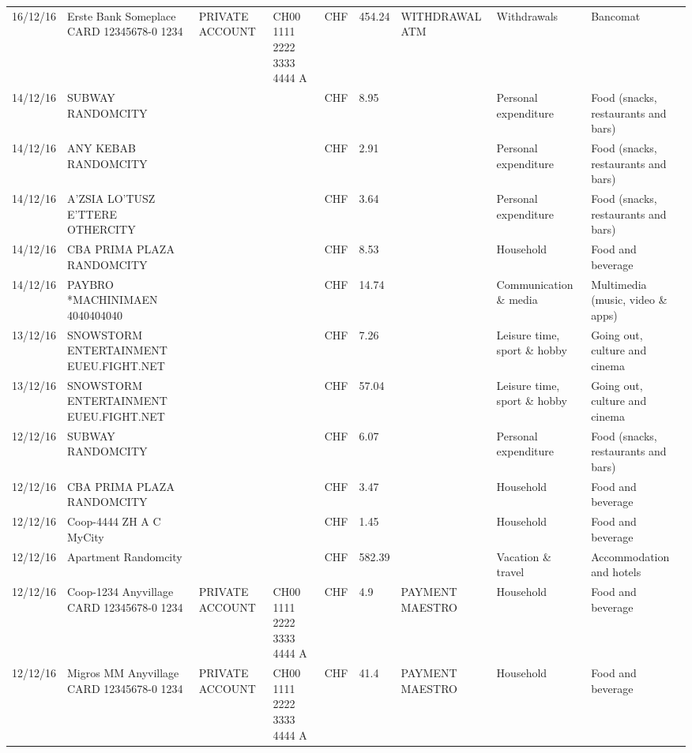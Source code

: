 \begin{landscape}
\begin{table}[t]
\begin{center}
\begin{tabular}{lllllllll}
		16/12/16 & Erste Bank Someplace CARD 12345678-0 1234 & PRIVATE ACCOUNT & CH00 1111 2222 3333 4444 A & CHF   & 454.24 & WITHDRAWAL ATM & Withdrawals & Bancomat \\
		14/12/16 & SUBWAY                   RANDOMCITY &       &       & CHF   & 8.95  &       & Personal expenditure & Food (snacks, restaurants and bars) \\
		14/12/16 & ANY KEBAB            RANDOMCITY &       &       & CHF   & 2.91  &       & Personal expenditure & Food (snacks, restaurants and bars) \\
		14/12/16 & A'ZSIA LO'TUSZ E'TTERE   OTHERCITY &       &       & CHF   & 3.64  &       & Personal expenditure & Food (snacks, restaurants and bars) \\
		14/12/16 & CBA PRIMA PLAZA        RANDOMCITY &       &       & CHF   & 8.53  &       & Household & Food and beverage \\
		14/12/16 & PAYBRO *MACHINIMAEN      4040404040 &       &       & CHF   & 14.74 &       & Communication \& media & Multimedia (music, video \& apps) \\
		13/12/16 & SNOWSTORM ENTERTAINMENT EUEU.FIGHT.NET &       &       & CHF   & 7.26  &       & Leisure time, sport \& hobby & Going out, culture and cinema \\
		13/12/16 & SNOWSTORM ENTERTAINMENT EUEU.FIGHT.NET &       &       & CHF   & 57.04 &       & Leisure time, sport \& hobby & Going out, culture and cinema \\
		12/12/16 & SUBWAY                   RANDOMCITY &       &       & CHF   & 6.07  &       & Personal expenditure & Food (snacks, restaurants and bars) \\
		12/12/16 & CBA PRIMA PLAZA        RANDOMCITY &       &       & CHF   & 3.47  &       & Household & Food and beverage \\
		12/12/16 & Coop-4444 ZH A C   MyCity &       &       & CHF   & 1.45  &       & Household & Food and beverage \\
		12/12/16 & Apartment               Randomcity &       &       & CHF   & 582.39 &       & Vacation \& travel & Accommodation and hotels \\
		12/12/16 & Coop-1234 Anyvillage CARD 12345678-0 1234 & PRIVATE ACCOUNT & CH00 1111 2222 3333 4444 A & CHF   & 4.9   & PAYMENT MAESTRO & Household & Food and beverage \\
		12/12/16 & Migros MM Anyvillage CARD 12345678-0 1234 & PRIVATE ACCOUNT & CH00 1111 2222 3333 4444 A & CHF   & 41.4  & PAYMENT MAESTRO & Household & Food and beverage \\

\end{tabular}
\end{center}
\end{table}
\end{landscape}
